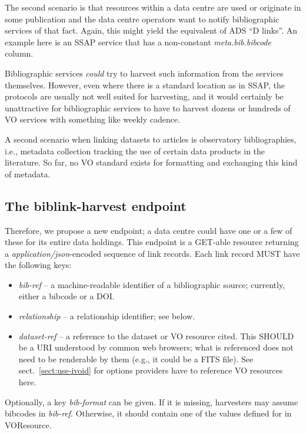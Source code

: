 \documentclass[11pt,a4paper]{ivoa}
\begin{document}
The second scenario is that resources within a data centre are used or
originate in some publication and the data centre operators want to
notify bibliographic services of that fact.  Again, this might yield the
equivalent of ADS ``D links''.  An example here is an SSAP
\citep{2012ivoa.spec.0210T} service that has a non-constant
\textsl{meta.bib.bibcode} column.

Bibliographic services \emph{could} try to harvest such information from
the services themselves.  However, even where there is a standard
location as in SSAP, the protocols are usually not well suited for
harvesting, and it would certainly be unattractive for bibliographic
services to have to harvest dozens or hundreds of VO services with
something like weekly cadence.

A second scenario when linking datasets to articles is observatory
bibliographies, i.e., metadata collection tracking the use of certain
data products in the literature.  So far, no VO standard exists for
formatting and exchanging this kind of metadata.


\subsection{The biblink-harvest endpoint}

Therefore, we propose a new endpoint; a data centre could have one or a
few of these for its entire data holdings.  This endpoint is a GET-able
resource returning a \textit{application/json}-encoded sequence of link
records.  Each link record MUST have the following keys:

\begin{itemize}
\item \textit{bib-ref} -- a machine-readable identifier of a bibliographic
source; currently, either a bibcode or a DOI.
\item \textit{relationship} -- a relationship identifier; see below.
\item \textit{dataset-ref} -- a reference to the dataset or VO resource cited.
This SHOULD be a URI understood by common web browsers; what is referenced
does not need to be renderable by them (e.g., it could be a FITS file).
See sect.~\ref{sect:use-ivoid} for options providers have to reference
VO resources here.
\end{itemize}

Optionally, a key \textit{bib-format} can be given.  If it is missing,
harvesters may assume bibcodes in \textit{bib-ref}.  Otherwise, it should
contain one of the values defined for  in
VOResource.
\end{document}
